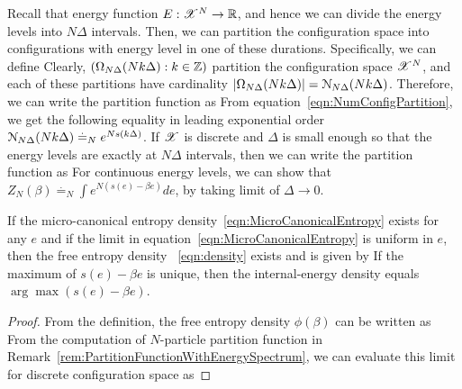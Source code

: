 \documentclass[letterpaper,english,10pt]{article}
\begin{document}
\begin{rem}
\label{rem:PartitionFunctionWithEnergySpectrum} 
Recall that energy function $E: \mathscr{X}^N \to \mathbb{R}$, and hence we can divide the energy levels into $N \Delta$ intervals. 
Then, we can partition the configuration space into configurations with energy level in one of these durations. 
Specifically, we can define 
Clearly, $(\Omega_{N\Delta}(Nk\Delta): k \in \mathbb{Z})$ partition the configuration space $\mathscr{X}^N$, 
and each of these partitions have cardinality $\left\lvert\Omega_{N\Delta}(Nk\Delta)\right\rvert = \mathcal{N}_{N\Delta}(Nk\Delta)$. 
Therefore, we can write the partition function as 
From equation~\eqref{eqn:NumConfigPartition}, we get the following equality in leading exponential order $\mathcal{N}_{N\Delta}(Nk\Delta) \stackrel{.}{=}_N e^{N s(k\Delta)}$. 
If $\mathscr{X}$ is discrete and $\Delta$ is small enough so that the energy levels are exactly at $N\Delta$ intervals, then we can write the partition function as 
For continuous energy levels, we can show that $Z_N(\beta) \stackrel{.}{=}_N \int e^{N (s(e)-\beta e)} de$, by taking limit of $\Delta \to 0$.
\end{rem}
\begin{prop}
If the micro-canonical entropy density~\eqref{eqn:MicroCanonicalEntropy} exists for any $e$ and if the limit in equation~\eqref{eqn:MicroCanonicalEntropy} is uniform in $e$, then the free entropy density ~\eqref{eqn:density} exists and is given by
If the maximum of $s(e)-\beta e$ is unique, 
then the internal-energy density equals $\arg\max(s(e)-\beta e)$.
\end{prop}
\begin{proof}
From the definition, the free entropy density $\phi(\beta)$ can be written as
From the computation of $N$-particle partition function in Remark~\ref{rem:PartitionFunctionWithEnergySpectrum}, we can evaluate this limit for discrete configuration space as 
\end{proof}
\end{document}
